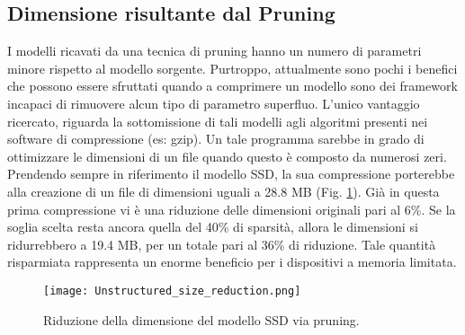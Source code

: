 \subsection{Dimensione risultante dal Pruning}
I modelli ricavati da una tecnica di pruning hanno un numero di parametri minore rispetto al modello sorgente. Purtroppo, attualmente sono pochi i benefici che possono essere sfruttati quando a comprimere un modello sono dei framework incapaci di rimuovere alcun tipo di parametro superfluo. L'unico vantaggio ricercato, riguarda la sottomissione di tali modelli agli algoritmi presenti nei software di compressione (es: gzip). Un tale programma sarebbe in grado di ottimizzare le dimensioni di un file quando questo è composto da numerosi zeri. Prendendo sempre in riferimento il modello SSD, la sua compressione porterebbe alla creazione di un file di dimensioni uguali a 28.8 MB (Fig. \ref{SSD_dim}). Già in questa prima compressione vi è una riduzione delle dimensioni originali pari al 6\%. Se la soglia scelta resta ancora quella del 40\% di sparsità, allora le dimensioni si ridurrebbero a 19.4 MB, per un totale pari al 36\% di riduzione. Tale quantità risparmiata rappresenta un enorme beneficio per i dispositivi a memoria limitata.
\begin{figure}
    \centering
    \texttt{[image: Unstructured\_size\_reduction.png]}
    \centering
    \caption{Riduzione della dimensione del modello SSD via pruning.}
    \label{SSD_dim}
\end{figure}

